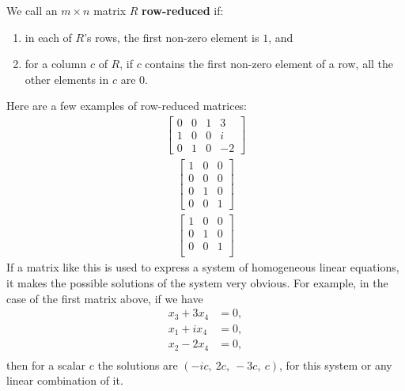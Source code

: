 \documentclass[12pt]{article}
\begin{document}
\begin{defn}
  We call an $m \times n$ matrix $R$ \textbf{row-reduced} if:
  \begin{enumerate}
      \item in each of $R$'s rows, the first non-zero element is
        $1$, and
      \item for a column $c$ of $R$, if $c$ contains the first
        non-zero element of a row, all the other elements in $c$
        are $0$.
  \end{enumerate}
\end{defn}

\begin{comm}
  Here are a few examples of row-reduced matrices:
  \begin{align*}
    \begin{bmatrix}
      0 & 0 & 1 & 3\\
      1 & 0 & 0 & i\\
      0 & 1 & 0 & -2
    \end{bmatrix}
  \end{align*}
  \begin{align*}
    \begin{bmatrix}
      1 & 0 & 0\\
      0 & 0 & 0\\
      0 & 1 & 0\\
      0 & 0 & 1
    \end{bmatrix}
  \end{align*}
  \begin{align*}
    \begin{bmatrix}
      1 & 0 & 0\\
      0 & 1 & 0\\
      0 & 0 & 1\\
    \end{bmatrix}
  \end{align*}
  If a matrix like this is used to express a system of
  homogeneous linear equations, it makes the possible solutions
  of the system very obvious. For example, in the case of the
  first matrix above, if we have
  \begin{align*}
    x_3 + 3x_4 & = 0,\\
    x_1 + ix_4 & = 0,\\
    x_2 - 2x_4 & = 0,\\
  \end{align*}
  then for a scalar $c$ the solutions are $(-ic,\ 2c,\ -3c,\ c)$,
  for this system or any linear combination of it.
\end{comm}
\end{document}
